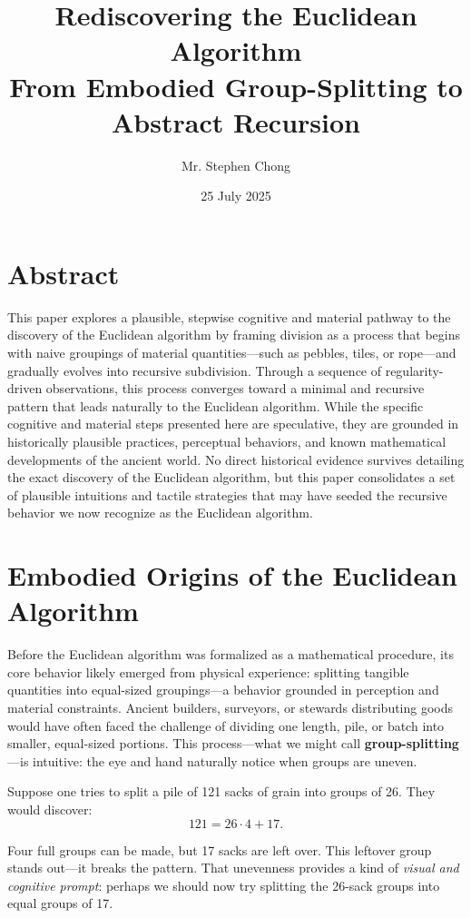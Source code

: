 \documentclass{article}
\title{Rediscovering the Euclidean Algorithm \\
\large From Embodied Group-Splitting to Abstract Recursion}
\author{Mr. Stephen Chong}
\date{25 July 2025}
\begin{document}
\maketitle

\section*{Abstract}
This paper explores a plausible, stepwise cognitive and material pathway to the discovery of the Euclidean algorithm by framing division as a process that begins with naive groupings of material quantities—such as pebbles, tiles, or rope—and gradually evolves into recursive subdivision. Through a sequence of regularity-driven observations, this process converges toward a minimal and recursive pattern that leads naturally to the Euclidean algorithm. While the specific cognitive and material steps presented here are speculative, they are grounded in historically plausible practices, perceptual behaviors, and known mathematical developments of the ancient world. No direct historical evidence survives detailing the exact discovery of the Euclidean algorithm, but this paper consolidates a set of plausible intuitions and tactile strategies that may have seeded the recursive behavior we now recognize as the Euclidean algorithm.


\section{Embodied Origins of the Euclidean Algorithm}
Before the Euclidean algorithm was formalized as a mathematical procedure, its core behavior likely emerged from physical experience: splitting tangible quantities into equal-sized groupings—a behavior grounded in perception and material constraints. Ancient builders, surveyors, or stewards distributing goods would have often faced the challenge of dividing one length, pile, or batch into smaller, equal-sized portions. This process—what we might call \textbf{group-splitting}—is intuitive: the eye and hand naturally notice when groups are uneven.

Suppose one tries to split a pile of 121 sacks of grain into groups of 26. They would discover:
\[ 121 = 26 \cdot 4 + 17. \]

Four full groups can be made, but 17 sacks are left over. This leftover group stands out—it breaks the pattern. That unevenness provides a kind of \textit{visual and cognitive prompt}: perhaps we should now try splitting the 26-sack groups into equal groups of 17.
\end{document}
